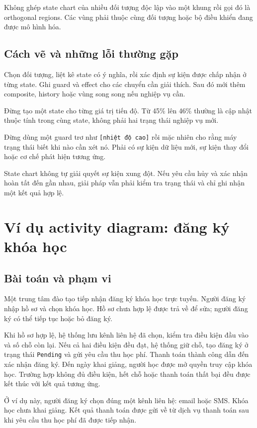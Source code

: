 \documentclass[12pt,a4paper]{article}
\newcommand{\code}[1]{\texttt{#1}}
\newcommand{\chapter}[1]{\clearpage\section{#1}}
\begin{document}
Không ghép state chart của nhiều đối tượng độc lập vào một khung rồi gọi đó là orthogonal regions. Các vùng phải thuộc cùng đối tượng hoặc bộ điều khiển đang được mô hình hóa.

\subsection{Cách vẽ và những lỗi thường gặp}
Chọn đối tượng, liệt kê state có ý nghĩa, rồi xác định sự kiện được chấp nhận ở từng state. Ghi guard và effect cho các chuyển cần giải thích. Sau đó mới thêm composite, history hoặc vùng song song nếu nghiệp vụ cần.

Đừng tạo một state cho từng giá trị tiến độ. Từ 45\% lên 46\% thường là cập nhật thuộc tính trong cùng state, không phải hai trạng thái nghiệp vụ mới.

Đừng dùng một guard trơ như \code{[nhiệt độ cao]} rồi mặc nhiên cho rằng máy trạng thái biết khi nào cần xét nó. Phải có sự kiện dữ liệu mới, sự kiện thay đổi hoặc cơ chế phát hiện tương ứng.

State chart không tự giải quyết sự kiện xung đột. Nếu yêu cầu hủy và xác nhận hoàn tất đến gần nhau, giải pháp vẫn phải kiểm tra trạng thái và chỉ ghi nhận một kết quả hợp lệ.


\chapter{Ví dụ activity diagram: đăng ký khóa học}
\subsection{Bài toán và phạm vi}
Một trung tâm đào tạo tiếp nhận đăng ký khóa học trực tuyến. Người đăng ký nhập hồ sơ và chọn khóa học. Hồ sơ chưa hợp lệ được trả về để sửa; người đăng ký có thể tiếp tục hoặc bỏ đăng ký.

Khi hồ sơ hợp lệ, hệ thống lưu kênh liên hệ đã chọn, kiểm tra điều kiện đầu vào và số chỗ còn lại. Nếu cả hai điều kiện đều đạt, hệ thống giữ chỗ, tạo đăng ký ở trạng thái \code{Pending} và gửi yêu cầu thu học phí. Thanh toán thành công dẫn đến xác nhận đăng ký. Đến ngày khai giảng, người học được mở quyền truy cập khóa học. Trường hợp không đủ điều kiện, hết chỗ hoặc thanh toán thất bại đều được kết thúc với kết quả tương ứng.

Ở ví dụ này, người đăng ký chọn đúng một kênh liên hệ: email hoặc SMS. Khóa học chưa khai giảng. Kết quả thanh toán được gửi về từ dịch vụ thanh toán sau khi yêu cầu thu học phí đã được tiếp nhận.
\end{document}
